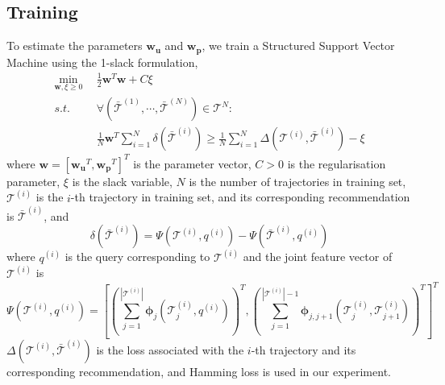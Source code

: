 {\subsection{Training}
To estimate the parameters $\mathbf{w_u}$ and $\mathbf{w_p}$, we train a Structured Support Vector Machine
using the 1-slack formulation,
\begin{align*}
    \min_{\mathbf{w}, \xi \ge 0} ~~& \frac{1}{2} \mathbf{w}^T \mathbf{w} + C \xi \\
    s.t. ~~& \forall \left( \bar{\mathcal{T}}^{(1)}, \cdots, \bar{\mathcal{T}}^{(N)} \right) \in \mathscr{T}^N: \\
         ~~& \frac{1}{N} \mathbf{w}^T \sum_{i=1}^N \delta \left( \bar{\mathcal{T}}^{(i)} \right) \ge
             \frac{1}{N} \sum_{i=1}^N \Delta \left( \mathcal{T}^{(i)}, \bar{\mathcal{T}}^{(i)} \right) - \xi
\end{align*}
where $\mathbf{w} = [\mathbf{w_u}^T, \mathbf{w_p}^T]^T$ is the parameter vector,
$C > 0$ is the regularisation parameter, $\xi$ is the slack variable, 
$N$ is the number of trajectories in training set, 
$\mathcal{T}^{(i)}$ is the $i$-th trajectory in training set, 
and its corresponding recommendation is $\bar{\mathcal{T}}^{(i)}$, and
\begin{displaymath}
    \delta \left( \bar{\mathcal{T}}^{(i)} \right) = \Psi \left( \mathcal{T}^{(i)}, q^{(i)} \right) - 
                                                    \Psi \left( \bar{\mathcal{T}}^{(i)}, q^{(i)} \right)
\end{displaymath}
where $q^{(i)}$ is the query corresponding to $\mathcal{T}^{(i)}$ and the joint feature vector of $\mathcal{T}^{(i)}$ is
\begin{displaymath}
\Psi \left( \mathcal{T}^{(i)}, q^{(i)} \right) = \left[
\left( \sum_{j=1}^{|\mathcal{T}^{(i)}|}   \mathbf{\phi}_{j}      \left( \mathcal{T}_{j}^{(i)}, q^{(i)} \right) \right)^T,
\left( \sum_{j=1}^{|\mathcal{T}^{(i)}|-1} \mathbf{\phi}_{j, j+1} \left( \mathcal{T}_{j}^{(i)}, \mathcal{T}_{j+1}^{(i)} \right) \right)^T 
\right]^T
\end{displaymath}
$\Delta \left( \mathcal{T}^{(i)}, \bar{\mathcal{T}}^{(i)} \right)$ is the loss associated with the $i$-th trajectory 
and its corresponding recommendation, and Hamming loss is used in our experiment.
}
